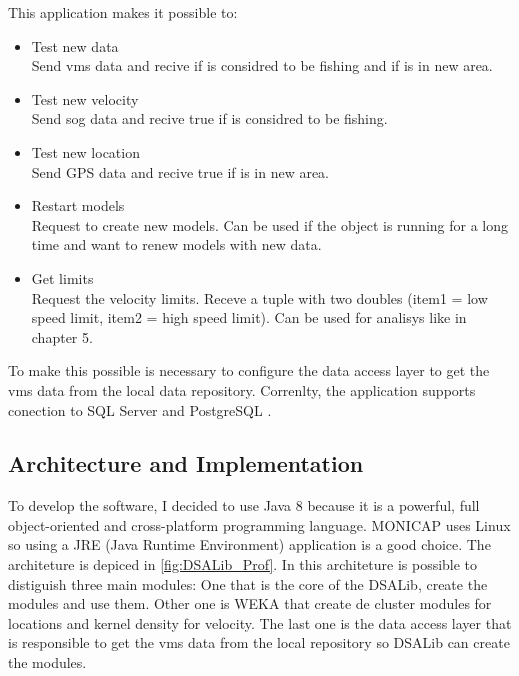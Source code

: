 This application makes it possible to:
\begin{itemize}
\item Test new data \\ Send vms data and recive if is considred to be fishing and if is in new area.
\item Test new velocity \\ Send sog data and recive true if is considred to be fishing.
\item Test new location \\ Send GPS data and recive true if is in new area.
\item Restart models \\ Request to create new models. Can be used if the object is running for a long time and want to renew models with new data. 
\item Get limits \\ Request the velocity limits. Receve a tuple with two doubles (item1 = low speed limit, item2 = high speed limit). Can be used for analisys like in chapter 5.
\end{itemize}

To make this possible is necessary to configure the data access layer to get the vms data from the local data repository.
Correnlty, the application supports conection to SQL Server \cite{WEBSITE:SqlServer} and PostgreSQL \cite{WEBSITE:Postgresql}.




\subsection{Architecture and Implementation} %
\label{sub:architecturee_implementation}
To develop the software, I decided to use Java 8 \cite{WEBSITE:OraJava8} because it is a powerful, full object-oriented and cross-platform programming language. MONICAP uses Linux so using a JRE (Java Runtime Environment) application is a good choice.
The architeture is depiced in \ref{fig:DSALib_Prof}. In this architeture is possible to distiguish three main modules: One that is the core of the DSALib, create the modules and use them. Other one is WEKA \cite{WEBSITE:Weka} that create de cluster modules for locations and kernel density for velocity. The last one is the data access layer that is responsible to get the vms data from the local repository so DSALib can create the modules.



